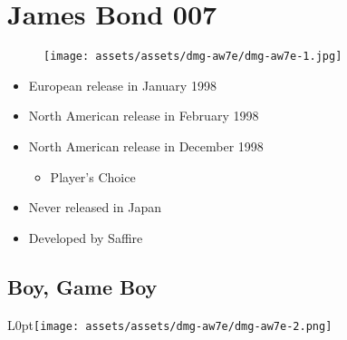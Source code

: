 \documentclass{book}
\begin{document}
\chapter*{James Bond 007}
\vspace{\baselineskip}\begin{figure}[H]{\texttt{[image: assets/assets/dmg-aw7e/dmg-aw7e-1.jpg]}}\end{figure}\vspace{\baselineskip}
\begin{itemize}[left=0pt, nosep]
\item European release in January 1998
\item North American release in February 1998
\item North American release in December 1998
\begin{itemize}
\item Player’s Choice
\end{itemize}
\item Never released in Japan
\item Developed by Saffire

\end{itemize}
\newpage\FloatBarrier\section*{Boy, Game Boy}
\begin{wrapfigure}{L}{0pt}{\texttt{[image: assets/assets/dmg-aw7e/dmg-aw7e-2.png]}}\end{wrapfigure}\noindent
\end{document}
